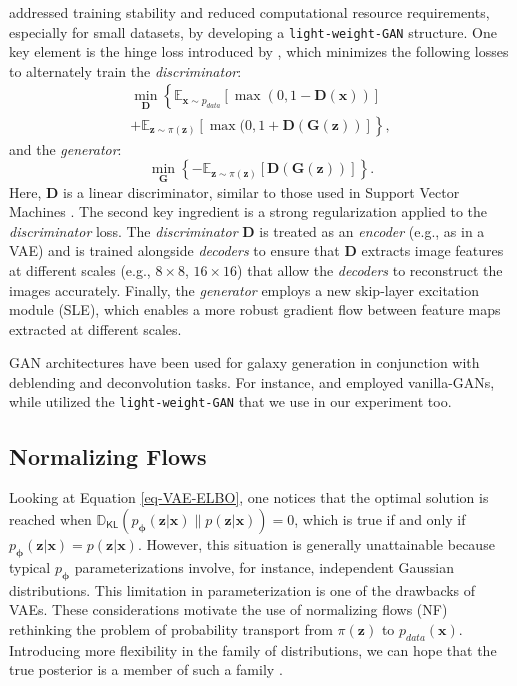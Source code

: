 \documentclass[fleqn,usenatbib]{mnras}
\newcommand{\Esp}[0]{\ensuremath{\mathbb{E}}}
\newcommand{\DKL}[0]{\ensuremath{\mathbb{D}_{\mathsf{KL}}}}
\begin{document}
\cite{liu2021towards} addressed training stability and reduced computational resource requirements, especially for small datasets, by developing a \texttt{light-weight-GAN} structure. One key element is the hinge loss introduced by \cite{Lim2017}, which minimizes the following losses to alternately train the \textit{discriminator}:
\begin{multline}
\min_{\bm{D}} \left\{\Esp_{\bm{x}\sim p_{data}}[\max{(0,1-\bm{D}(\bm{x}))}] 
\right. \label{eq-discri-hinge-loss}\\ 
 \left. + \Esp_{\bm{z}\sim \pi(\bm{z})}[\max{(0,1+\bm{D}(\bm{G}(\bm{z}))}]
\right\},
\end{multline}
and the \textit{generator}:
\begin{equation}
\min_{\bm{G}} \left\{-\Esp_{\bm{z}\sim \pi(\bm{z})}[\bm{D}(\bm{G}(\bm{z}))]
\right \}.
\end{equation}
Here, $\bm{D}$ is a linear discriminator, similar to those used in Support Vector Machines \citep{Vapnik1997}. The second key ingredient is a strong regularization applied to the \textit{discriminator} loss. The \textit{discriminator} $\bm{D}$ is treated as an \textit{encoder} (e.g., as in a VAE) and is trained alongside \textit{decoders} to ensure that $\bm{D}$ extracts image features at different scales (e.g., $8\times 8$, $16\times 16$) that allow the \textit{decoders} to reconstruct the images accurately. Finally, the \textit{generator} employs a new skip-layer excitation module (SLE), which enables a more robust gradient flow between feature maps extracted at different scales.

GAN architectures have been used for galaxy generation in conjunction with deblending and deconvolution tasks. For instance, \cite{Schawinski2017} and \cite{Hemmati_2022} employed vanilla-GANs, while \cite{Coccomini2021} utilized the \texttt{light-weight-GAN} that we use in our experiment too.
%
\subsection{Normalizing Flows}
\label{sec-NF}
%
Looking at Equation \ref{eq-VAE-ELBO}, one notices that the optimal solution is reached when $\DKL(p_{\bm{\phi}}(\bm{z}|\bm{x})\| p(\bm{z}|\bm{x})) = 0$, which is true if and only if $p_{\bm{\phi}}(\bm{z}|\bm{x}) = p(\bm{z}|\bm{x})$. However, this situation is generally unattainable because typical $p_{\bm{\phi}}$ parameterizations involve, for instance, independent Gaussian distributions. This limitation in parameterization is one of the drawbacks of VAEs. {\color{red} These considerations motivate the use of normalizing flows (NF) rethinking the problem of probability transport from $\pi(\bm{z})$ to $p_{data}(\bm{x})$. Introducing more flexibility in the family of distributions, we can hope that the true posterior is a member of such a family \citep{Tabak2010, Tabak2013a, Rezende2015}.}
\end{document}

